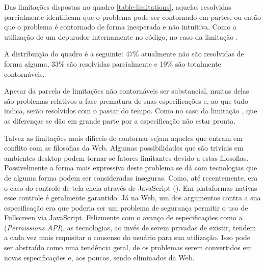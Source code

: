 Das limitações dispostas no quadro \ref{table:limitations},
aquelas resolvidas parcialmente identificam que o problema pode
ser contornado em partes, ou então que o problema é contornado
de forma inesperada e não intuitiva. Como a utilização de
um depurador internamente no código, no caso da limitação
. 

A distribuição do quadro é a seguinte: 47\% atualmente não são
resolvidas de forma alguma, 33\% são resolvidas parcialmente e 19\%
são totalmente contornáveis.

Apesar da parcela de limitações não contornáveis ser substancial,
muitas delas são problemas relativos a fase prematura de suas
especificações e, ao que tudo indica, serão resolvidos com o passar
do tempo. Como no caso da limitação ,
que as diferenças se dão em grande parte por a especificação não
estar pronta.

Talvez as limitações mais difíceis de contornar sejam aqueles que
entram em conflito com as filosofias da Web. Algumas possibilidades
que são triviais em ambientes desktop podem tornar-se fatores
limitantes devido a estas filosofias. Possivelmente a forma mais
expressiva deste problema se dá com tecnologias que de alguma
forma podem ser consideradas inseguras. Como, até recentemente,
era o caso do controle de tela cheia através de JavaScript
(). Em plataformas nativas esse
controle é geralmente garantido. Já na Web, um dos argumentos contra
a sua especificação era que poderia ser um problema de segurança
permitir o uso de Fullscreen via JavaScript. Felizmente com o avanço de
especificações como a (\textit{Permissions API}), as tecnologias, ao
invés de serem privadas de existir, tendem a cada vez mais requisitar
o consenso do usuário para sua utilização. Isso pode ser abstraído
como uma tendência geral, de os problemas serem convertidos em novas
especificações e, aos poucos, sendo eliminados da Web.
